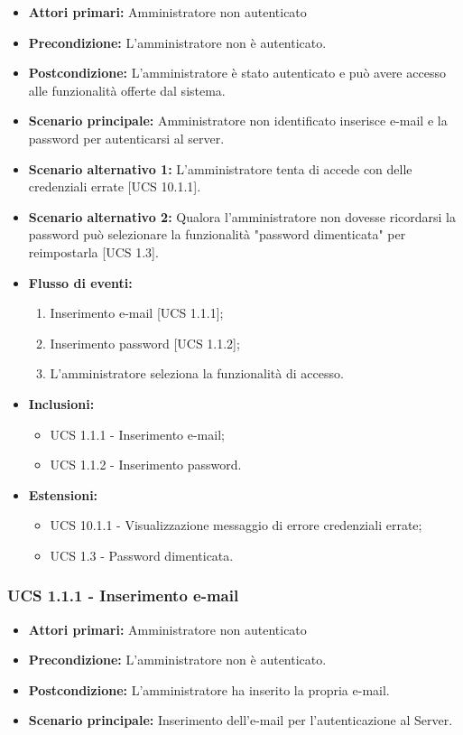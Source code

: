 \begin{itemize}
\item \textbf{Attori primari:} Amministratore non autenticato
\item \textbf{Precondizione:} L'amministratore non è autenticato.
\item \textbf{Postcondizione:} L'amministratore è stato autenticato e può avere accesso alle funzionalità offerte dal sistema.
\item \textbf{Scenario principale:} Amministratore non identificato inserisce e-mail e la password per autenticarsi al server.
\item \textbf{Scenario alternativo 1:} L'amministratore tenta di accede con delle credenziali errate [UCS 10.1.1].
\item \textbf{Scenario alternativo 2:} Qualora l'amministratore non dovesse ricordarsi la password può selezionare la funzionalità "password dimenticata" per reimpostarla [UCS 1.3].
\item \textbf{Flusso di eventi:}
    \begin{enumerate}
        \item Inserimento e-mail [UCS 1.1.1];
        \item Inserimento password [UCS 1.1.2];
        \item L'amministratore seleziona la funzionalità di accesso.
    \end{enumerate}
    \item \textbf{Inclusioni:}
	\begin{itemize}		
		\item UCS 1.1.1 - Inserimento e-mail;
		\item UCS 1.1.2 - Inserimento password.
	\end{itemize}
    \item \textbf{Estensioni:}
    \begin{itemize}
		\item UCS 10.1.1 - Visualizzazione messaggio di errore credenziali errate;
		\item UCS 1.3 - Password dimenticata.
	\end{itemize}
\end{itemize}

\subsubsection{UCS 1.1.1 - Inserimento e-mail}%
\begin{itemize}
\item \textbf{Attori primari:} Amministratore non autenticato
\item \textbf{Precondizione:} L'amministratore non è autenticato.
\item \textbf{Postcondizione:} L'amministratore ha inserito la propria e-mail.
\item \textbf{Scenario principale:} Inserimento dell'e-mail per l'autenticazione al Server.
\end{itemize}

